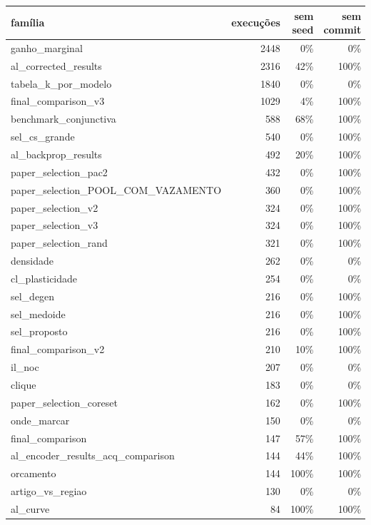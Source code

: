 \begin{tabular}{lrrr}
\hline
família & execuções & sem seed & sem commit \\
\hline
ganho\_marginal & 2448 & 0\% & 0\% \\
al\_corrected\_results & 2316 & 42\% & 100\% \\
tabela\_k\_por\_modelo & 1840 & 0\% & 0\% \\
final\_comparison\_v3 & 1029 & 4\% & 100\% \\
benchmark\_conjunctiva & 588 & 68\% & 100\% \\
sel\_cs\_grande & 540 & 0\% & 100\% \\
al\_backprop\_results & 492 & 20\% & 100\% \\
paper\_selection\_pac2 & 432 & 0\% & 100\% \\
paper\_selection\_POOL\_COM\_VAZAMENTO & 360 & 0\% & 100\% \\
paper\_selection\_v2 & 324 & 0\% & 100\% \\
paper\_selection\_v3 & 324 & 0\% & 100\% \\
paper\_selection\_rand & 321 & 0\% & 100\% \\
densidade & 262 & 0\% & 0\% \\
cl\_plasticidade & 254 & 0\% & 0\% \\
sel\_degen & 216 & 0\% & 100\% \\
sel\_medoide & 216 & 0\% & 100\% \\
sel\_proposto & 216 & 0\% & 100\% \\
final\_comparison\_v2 & 210 & 10\% & 100\% \\
il\_noc & 207 & 0\% & 0\% \\
clique & 183 & 0\% & 0\% \\
paper\_selection\_coreset & 162 & 0\% & 100\% \\
onde\_marcar & 150 & 0\% & 0\% \\
final\_comparison & 147 & 57\% & 100\% \\
al\_encoder\_results\_acq\_comparison & 144 & 44\% & 100\% \\
orcamento & 144 & 100\% & 100\% \\
artigo\_vs\_regiao & 130 & 0\% & 0\% \\
al\_curve & 84 & 100\% & 100\% \\

\end{tabular}
